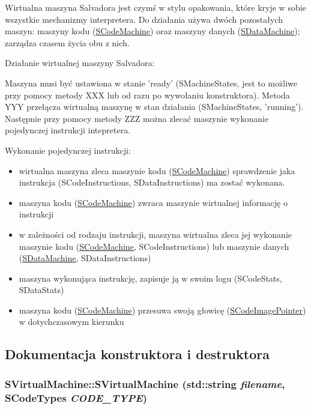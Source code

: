 Wirtualna maszyna Salvadora jest czymś w stylu opakowania, które kryje w sobie wszystkie mechanizmy interpretera. Do działania używa dwóch pozostałych maszyn: maszyny kodu (\hyperlink{classSCodeMachine}{SCodeMachine}) oraz maszyny danych (\hyperlink{classSDataMachine}{SDataMachine}); zarządza czasem życia obu z nich.

Działanie wirtualnej maszyny Salvadora:

Maszyna musi być ustawiona w stanie 'ready' (SMachineStates, jest to możliwe przy pomocy metody XXX lub od razu po wywołaniu konstruktora). Metoda YYY przełącza wirtualną maszynę w stan działania (SMachineStates, 'running'). Następnie przy pomocy metody ZZZ można zlecać maszynie wykonanie pojedynczej instrukcji intepretera.

Wykonanie pojedynczej instrukcji:

\begin{itemize}
\item wirtualna maszyna zleca maszynie kodu (\hyperlink{classSCodeMachine}{SCodeMachine}) sprawdzenie jaka instrukcja (SCodeInstructions, SDataInstructions) ma zostać wykonana.\item maszyna kodu (\hyperlink{classSCodeMachine}{SCodeMachine}) zwraca maszynie wirtualnej informację o instrukcji\item w zależności od rodzaju instrukcji, maszyna wirtualna zleca jej wykonanie maszynie kodu (\hyperlink{classSCodeMachine}{SCodeMachine}, SCodeInstructions) lub maszynie danych (\hyperlink{classSDataMachine}{SDataMachine}, SDataInstructions)\item maszyna wykonująca instrukcję, zapisuje ją w swoim logu (SCodeStats, SDataStats)\item maszyna kodu (\hyperlink{classSCodeMachine}{SCodeMachine}) przesuwa swoją głowicę (\hyperlink{classSCodeImagePointer}{SCodeImagePointer}) w dotychczasowym kierunku \end{itemize}


\subsection{Dokumentacja konstruktora i destruktora}
\hypertarget{classSVirtualMachine_020a4e9202a688dffed1e0d8951f9164}{
\subsubsection[{SVirtualMachine}]{\setlength{\rightskip}{0pt plus 5cm}SVirtualMachine::SVirtualMachine (std::string {\em filename}, \/  {\bf SCodeTypes} {\em CODE\_\-TYPE})}}
\label{classSVirtualMachine_020a4e9202a688dffed1e0d8951f9164}


